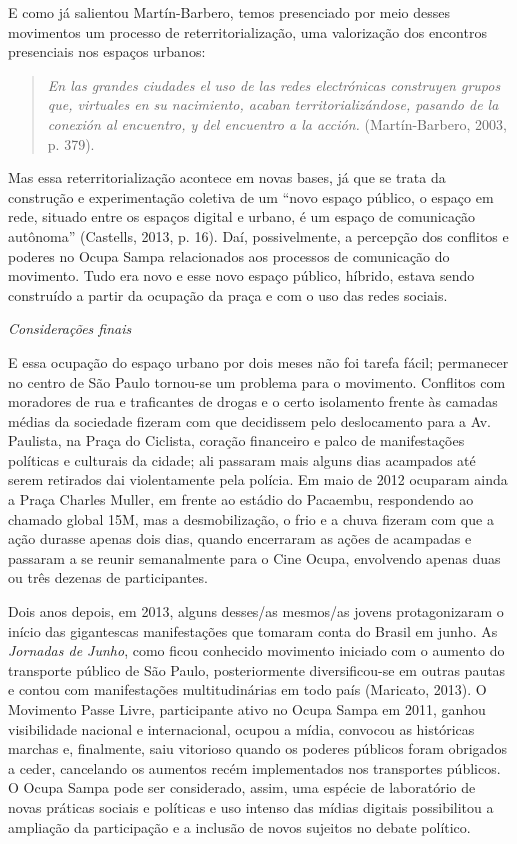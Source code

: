 E como já salientou Martín-Barbero, temos presenciado por meio desses
movimentos um processo de reterritorialização, uma valorização dos
encontros presenciais nos espaços urbanos:

\begin{quote}
\emph{En las grandes ciudades el uso de las redes electrónicas
construyen grupos que, virtuales en su nacimiento, acaban
territorializándose, pasando de la conexión al encuentro, y del
encuentro a la acción.} (Martín-Barbero, 2003, p. 379).
\end{quote}

Mas essa reterritorialização acontece em novas bases, já que se trata da
construção e experimentação coletiva de um ``novo espaço público, o
espaço em rede, situado entre os espaços digital e urbano, é um espaço
de comunicação autônoma'' (Castells, 2013, p. 16). Daí, possivelmente, a
percepção dos conflitos e poderes no Ocupa Sampa relacionados aos
processos de comunicação do movimento. Tudo era novo e esse novo espaço
público, híbrido, estava sendo construído a partir da ocupação da praça
e com o uso das redes sociais.

\emph{Considerações finais}

E essa ocupação do espaço urbano por dois meses não foi tarefa fácil;
permanecer no centro de São Paulo tornou-se um problema para o
movimento. Conflitos com moradores de rua e traficantes de drogas e o
certo isolamento frente às camadas médias da sociedade fizeram com que
decidissem pelo deslocamento para a Av. Paulista, na Praça do Ciclista,
coração financeiro e palco de manifestações políticas e culturais da
cidade; ali passaram mais alguns dias acampados até serem retirados dai
violentamente pela polícia. Em maio de 2012 ocuparam ainda a Praça
Charles Muller, em frente ao estádio do Pacaembu, respondendo ao chamado
global 15M, mas a desmobilização, o frio e a chuva fizeram com que a
ação durasse apenas dois dias, quando encerraram as ações de acampadas e
passaram a se reunir semanalmente para o Cine Ocupa, envolvendo apenas
duas ou três dezenas de participantes.

Dois anos depois, em 2013, alguns desses/as mesmos/as jovens
protagonizaram o início das gigantescas manifestações que tomaram conta
do Brasil em junho. As \emph{Jornadas de Junho}, como ficou conhecido
movimento iniciado com o aumento do transporte público de São Paulo,
posteriormente diversificou-se em outras pautas e contou com
manifestações multitudinárias em todo país (Maricato, 2013). O Movimento
Passe Livre, participante ativo no Ocupa Sampa em 2011, ganhou
visibilidade nacional e internacional, ocupou a mídia, convocou as
históricas marchas e, finalmente, saiu vitorioso quando os poderes
públicos foram obrigados a ceder, cancelando os aumentos recém
implementados nos transportes públicos. O Ocupa Sampa pode ser
considerado, assim, uma espécie de laboratório de novas práticas sociais
e políticas e uso intenso das mídias digitais possibilitou a ampliação
da participação e a inclusão de novos sujeitos no debate político.

